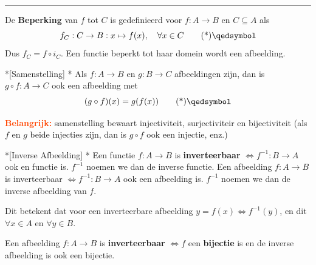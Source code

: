 \begin{nicedefinition}
    \vspace{0.25cm}
    \hrule

    \vspace{0.5cm}

    De \textcolor{PineGreen!75!black}{\textbf{Beperking}} van $f$ tot $C$ is gedefinieerd voor $f : A \rightarrow B$ en $C \subseteq A$ als
    \begin{equation}
        f_C: C \rightarrow B: x \mapsto f(x), \quad \forall x \in C \qedtag
    \end{equation}
    Dus $f_C = f \circ i_C$. Een functie beperkt tot haar domein wordt een afbeelding.
\end{nicedefinition}


\begin{nicetheorem}*[Samenstelling]
    \nextpart[Samenstelling.]*
    Als $f:A \rightarrow B$ en $g: B \rightarrow C$ afbeeldingen zijn, dan is $g \circ f : A \rightarrow C$ ook een afbeelding met
    \begin{equation}
        (g \circ f)(x) = g(f(x)) \qedtag
    \end{equation}
\end{nicetheorem}

\begin{barbox}[OrangeRed][gray!5]
    \textcolor{OrangeRed}{\textbf{Belangrijk:}} samenstelling bewaart injectiviteit, surjectiviteir en bijectiviteit (als $f$ en $g$ beide injecties zijn, dan is $g \circ f$ ook een injectie, enz.)
\end{barbox}


\begin{nicedefinition}*[Inverse Afbeelding]
    *
    Een functie $f : A \rightarrow B$ is \textbf{inverteerbaar} $\Longleftrightarrow f^{-1} : B \rightarrow A$ ook en functie is. $f^{-1}$ noemen we dan de inverse functie. Een afbeelding $f: A \rightarrow B$ is inverteerbaar $\Longleftrightarrow f^{-1} : B \rightarrow A$ ook een afbeelding is. $f^{-1}$ noemen we dan de inverse afbeelding van $f$.

    \vspace{0.5cm}

    Dit betekent dat voor een inverteerbare afbeelding $y = f(x) \Leftrightarrow f^{-1}(y)$, en dit $\forall x \in A$ en $\forall y \in B$. 

    \vspace{0.5cm}

    Een afbeelding $f : A \rightarrow B$ is \textbf{inverteerbaar} $\Longleftrightarrow f$ een \textbf{bijectie} is en de inverse afbeelding is ook een bijectie.
\end{nicedefinition}


